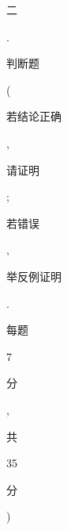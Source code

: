 \documentclass[10pt]{article}
\begin{document}
\begin{CJK}{UTF8}{mj}二\end{CJK}. \begin{CJK}{UTF8}{mj}判断题\end{CJK} (\begin{CJK}{UTF8}{mj}若结论正确\end{CJK}, \begin{CJK}{UTF8}{mj}请证明\end{CJK}; \begin{CJK}{UTF8}{mj}若错误\end{CJK}, \begin{CJK}{UTF8}{mj}举反例证明\end{CJK}. \begin{CJK}{UTF8}{mj}每题\end{CJK} 7 \begin{CJK}{UTF8}{mj}分\end{CJK}, \begin{CJK}{UTF8}{mj}共\end{CJK} 35 \begin{CJK}{UTF8}{mj}分\end{CJK})
\end{document}
